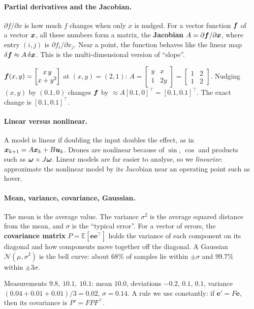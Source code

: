 \paragraph{Partial derivatives and the Jacobian.} $\partial f/\partial x$ is how much $f$ changes when only $x$ is
nudged. For a vector function $\bm{f}$ of a vector $\bm{x}$, all these numbers form a matrix, the \textbf{Jacobian}
$A=\partial\bm{f}/\partial\bm{x}$, where entry $(i,j)$ is $\partial f_i/\partial x_j$. Near a point, the function behaves like
the linear map $\delta\bm{f}\approx A\,\delta\bm{x}$. This is the multi-dimensional version of ``slope''.
\begin{toybox}
$\bm{f}(x,y)=\begin{bmatrix}x\,y\\ x+y^2\end{bmatrix}$ at $(x,y)=(2,1)$:\quad
$A=\begin{bmatrix}y&x\\1&2y\end{bmatrix}=\begin{bmatrix}1&2\\1&2\end{bmatrix}$.
Nudging $(x,y)$ by $(0.1,0)$ changes $\bm{f}$ by $\approx A[0.1,0]^\top=[0.1,0.1]^\top$. The exact change is
$[0.1,0.1]^\top$.
\end{toybox}

\paragraph{Linear versus nonlinear.} A model is linear if doubling the input doubles the effect, as in
$\bm{x}_{k+1}=A\bm{x}_k+B\bm{u}_k$. Drones are nonlinear because of $\sin$, $\cos$ and products such as $\bm{\omega}\times J\bm{\omega}$. Linear
models are far easier to analyse, so we \emph{linearize}: approximate the nonlinear model by its Jacobian near an
operating point such as hover.

\paragraph{Mean, variance, covariance, Gaussian.} The mean is the average value. The variance $\sigma^2$ is the
average squared distance from the mean, and $\sigma$ is the ``typical error''. For a vector of errors, the
\textbf{covariance matrix} $P=\mathbb E[\bm e\bm e^\top]$ holds the variance of each component on its diagonal and
how components move together off the diagonal. A Gaussian $\mathcal N(\mu,\sigma^2)$ is the bell curve: about 68\% of
samples lie within $\pm\sigma$ and 99.7\% within $\pm3\sigma$.
\begin{toybox}
Measurements $9.8,\ 10.1,\ 10.1$: mean $10.0$, deviations $-0.2,\,0.1,\,0.1$, variance $(0.04+0.01+0.01)/3=0.02$,
$\sigma=0.14$. A rule we use constantly: if $\bm e'=F\bm e$, then its covariance is $P'=FPF^\top$.
\end{toybox}

